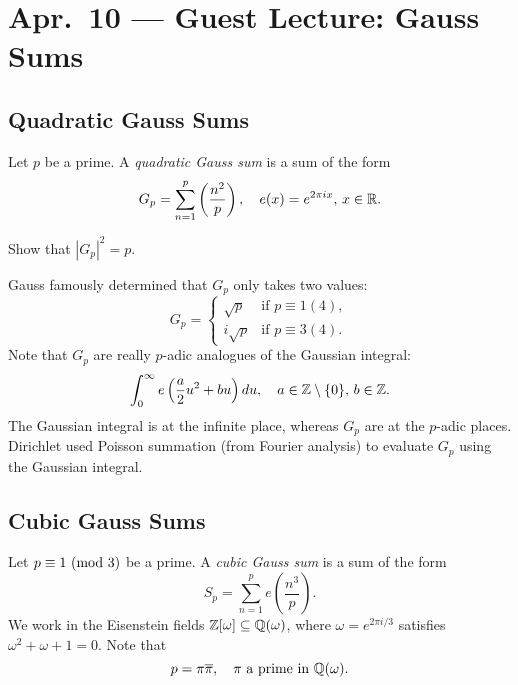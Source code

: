 \chapter{Apr.~10 --- Guest Lecture: Gauss Sums}

\section{Quadratic Gauss Sums}

\begin{definition}
  Let $p$ be a prime. A \emph{quadratic Gauss sum}
  is a sum of the form
  \[
    G_p = \sum_{n = 1}^p \left(\frac{n^2}{p}\right), \quad e(x) = e^{2\pi ix},\, x \in \mathbb{R}.
  \]
\end{definition}

\begin{exercise}
  Show that $|G_{p}|^2 = p$.
\end{exercise}

\begin{remark}
  Gauss famously determined that $G_p$
  only takes two values:
  \[
    G_p =
    \begin{cases}
      \sqrt{p} & \text{if $p \equiv 1 (4)$}, \\
      i \sqrt{p} & \text{if $p \equiv 3 (4)$}.
    \end{cases}
  \]
  Note that $G_p$ are really $p$-adic
  analogues of the Gaussian integral:
  \[
    \int_0^\infty e\left(\frac{a}{2} u^2 + bu\right) du, \quad a \in \mathbb{Z} \setminus \{0\},\, b \in \mathbb{Z}.
  \]
  The Gaussian integral is at the infinite
  place, whereas $G_p$ are at the $p$-adic
  places. Dirichlet used Poisson summation
  (from Fourier analysis) to evaluate $G_p$
  using the Gaussian integral.
\end{remark}

\section{Cubic Gauss Sums}

\begin{definition}
  Let $p \equiv 1 \ (\mathrm{mod}\ 3)$ be a prime.
  A \emph{cubic Gauss sum} is a sum of the form
  \[
    S_p = \sum_{n = 1}^p e\left(\frac{n^3}{p}\right).
  \]
  We work in the Eisenstein fields
  $\mathbb{Z}[\omega] \subseteq \mathbb{Q}(\omega)$, where
  $\omega = e^{2\pi i / 3}$ satisfies
  $\omega^2 + \omega + 1 = 0$. Note that
  \[
    p = \pi \overline{\pi}, \quad \pi \text{ a prime in } \mathbb{Q}(\omega).
  \]
\end{definition}

